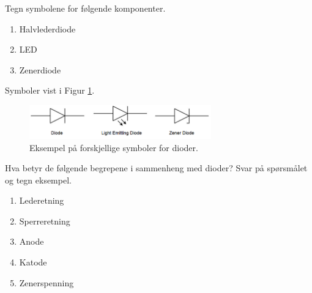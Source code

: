 
\begin{question}[name=Oppgave, topic=dioder]
	Tegn symbolene for følgende komponenter.
	\begin{enumerate}[label=\roman*)]
		\item Halvlederdiode
		\item LED
		\item Zenerdiode
	\end{enumerate}
\end{question}

\vspace{0.5cm} %

\begin{solution}[name=Løsningsforslag oppgave]
Symboler vist i Figur \ref{fig:diodeSymb}.
	\begin{figure}[H]
		\centering
		\includegraphics[width=0.7\textwidth]{diode/figurer/oppgave1.png}
		\caption{Eksempel på forskjellige symboler for dioder.}
		\label{fig:diodeSymb}
	\end{figure}
\end{solution}

\vspace{0.5cm} %

\begin{question}[name=Oppgave, topic=dioder]
Hva betyr de følgende begrepene i sammenheng med dioder? Svar på spørsmålet og tegn eksempel.
	\begin{enumerate}[label=\roman*)]
		\item Lederetning
		\item Sperreretning
		\item Anode
		\item Katode
		\item Zenerspenning
	\end{enumerate}
\end{question}

\vspace{0.5cm} %

